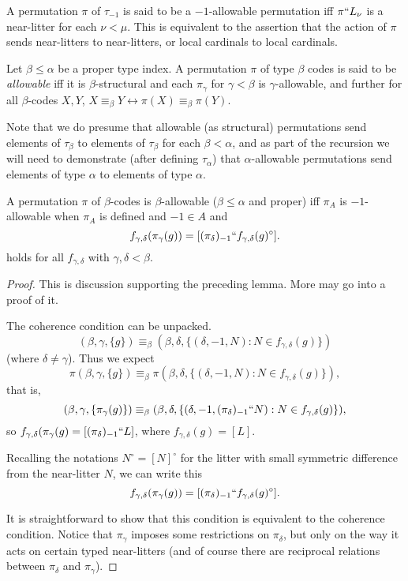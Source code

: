 \begin{definition}
\label {def:allowable}

A permutation $\pi$ of $\tau_{-1}$ is said to be a $-1$-allowable permutation iff $\pi``L_\nu$ is a near-litter for
each $\nu<\mu$.  This is equivalent to the assertion that the action of $\pi$ sends near-litters to near-litters, or local cardinals to local cardinals.

Let $\beta \leq \alpha$ be a proper type index.  A permutation $\pi$ of type $\beta$ codes is said to be
{\em allowable\/} iff it is $\beta$-structural and each $\pi_\gamma$ for $\gamma<\beta$ is $\gamma$-allowable, and further
for all $\beta$-codes $X,Y$, $X \equiv_\beta Y \leftrightarrow \pi(X) \equiv_\beta \pi(Y)$.

Note that we do presume that allowable (as structural) permutations send elements of $\tau_\beta$ to elements of
$\tau_\beta$ for each $\beta<\alpha$, and as part of the recursion we will need to demonstrate (after defining $\tau_\alpha$) that $\alpha$-allowable permutations send elements of type $\alpha$ to elements of type $\alpha$.

\end{definition}

\begin{lemma}
\label {lem:coherence-unpacked}

A permutation $\pi$ of $\beta$-codes is $\beta$-allowable ($\beta \leq \alpha$ and proper) iff $\pi_A$ is $-1$-allowable when $\pi_A$ is defined and $-1 \in A$
and  $$f_{\gamma,\delta}(\pi_\gamma(g)) = [(\pi_\delta)_{-1}``f_{\gamma,\delta}(g)^\circ].$$
holds for all $f_{\gamma,\delta}$ with $\gamma,\delta<\beta$.

\end{lemma}

\begin{proof}
This is discussion supporting the preceding lemma.  More may go into a proof of it.

The coherence condition can be unpacked.  $$(\beta,\gamma,\{g\}) \equiv_{\beta} (\beta,\delta,\{(\delta,-1,N):N \in f_{\gamma,\delta}(g)\})$$ (where $\delta\neq \gamma$).  Thus we expect $$\pi(\beta,\gamma,\{g\}) \equiv_{\beta} \pi(\beta,\delta,\{(\delta,-1,N):N \in f_{\gamma,\delta}(g)\}),$$ that is, $$(\beta,\gamma,\{\pi_{\gamma}(g)\}) \equiv_{\beta} (\beta,\delta,\{(\delta,-1,(\pi_{\delta})_{-1}``N):N \in f_{\gamma,\delta}(g)\}),$$ so $f_{\gamma,\delta}(\pi_\gamma(g) = [(\pi_\delta)_{-1}``L]$, where $f_{\gamma,\delta}(g)=[L]$.

Recalling the notations $N^\circ=[N]^\circ$ for the litter with small symmetric difference from the near-litter $N$, we can write this $$f_{\gamma,\delta}(\pi_\gamma(g)) = [(\pi_\delta)_{-1}``f_{\gamma,\delta}(g)^\circ].$$

It is straightforward to show that this condition is equivalent to the coherence condition.  Notice that $\pi_\gamma$ imposes some restrictions on $\pi_\delta$, but only on the way it acts on certain typed near-litters (and of course there are reciprocal relations between $\pi_{\delta}$ and $\pi_\gamma$).
\end{proof}

